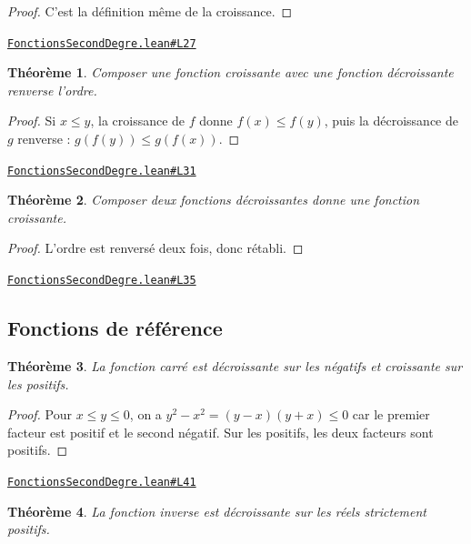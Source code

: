 \documentclass[11pt,a4paper]{article}
\theoremstyle{definition}
\theoremstyle{plain}
\newtheorem{theoreme}{Théorème}
\newcommand{\source}[2]{\par\smallskip\noindent\hfill{\footnotesize\href{#1}{\texttt{#2}}}\par\smallskip}
\begin{document}
\begin{proof}
C'est la définition même de la croissance.
\end{proof}
\source{https://github.com/Commutator-IO/learn-lean/blob/main/courses/02-lycee/02-fonctions-second-degre/FonctionsSecondDegre.lean\#L27}{FonctionsSecondDegre.lean\#L27}

\begin{theoreme}
Composer une fonction croissante avec une fonction décroissante renverse l'ordre.
\end{theoreme}

\begin{proof}
Si $x \le y$, la croissance de $f$ donne $f(x) \le f(y)$, puis la décroissance de $g$
renverse : $g(f(y)) \le g(f(x))$.
\end{proof}
\source{https://github.com/Commutator-IO/learn-lean/blob/main/courses/02-lycee/02-fonctions-second-degre/FonctionsSecondDegre.lean\#L31}{FonctionsSecondDegre.lean\#L31}

\begin{theoreme}
Composer deux fonctions décroissantes donne une fonction croissante.
\end{theoreme}

\begin{proof}
L'ordre est renversé deux fois, donc rétabli.
\end{proof}
\source{https://github.com/Commutator-IO/learn-lean/blob/main/courses/02-lycee/02-fonctions-second-degre/FonctionsSecondDegre.lean\#L35}{FonctionsSecondDegre.lean\#L35}

\subsection{Fonctions de référence}

\begin{theoreme}
La fonction carré est décroissante sur les négatifs et croissante sur les positifs.
\end{theoreme}

\begin{proof}
Pour $x \le y \le 0$, on a $y^2 - x^2 = (y-x)(y+x) \le 0$ car le premier facteur est
positif et le second négatif. Sur les positifs, les deux facteurs sont positifs.
\end{proof}
\source{https://github.com/Commutator-IO/learn-lean/blob/main/courses/02-lycee/02-fonctions-second-degre/FonctionsSecondDegre.lean\#L41}{FonctionsSecondDegre.lean\#L41}

\begin{theoreme}
La fonction inverse est décroissante sur les réels strictement positifs.
\end{theoreme}
\end{document}
